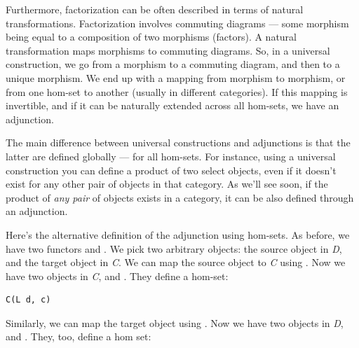 Furthermore, factorization can be often described in terms of natural
transformations. Factorization involves commuting diagrams --- some
morphism being equal to a composition of two morphisms (factors). A
natural transformation maps morphisms to commuting diagrams. So, in a
universal construction, we go from a morphism to a commuting diagram,
and then to a unique morphism. We end up with a mapping from morphism to
morphism, or from one hom-set to another (usually in different
categories). If this mapping is invertible, and if it can be naturally
extended across all hom-sets, we have an adjunction.

The main difference between universal constructions and adjunctions is
that the latter are defined globally --- for all hom-sets. For instance,
using a universal construction you can define a product of two select
objects, even if it doesn't exist for any other pair of objects in that
category. As we'll see soon, if the product of \emph{any pair} of
objects exists in a category, it can be also defined through an
adjunction.

\begin{figure}[H]
\centering
{}
\end{figure}

\noindent
Here's the alternative definition of the adjunction using hom-sets. As
before, we have two functors  and
. We pick two arbitrary objects: the
source object  in \emph{D}, and the target object 
in \emph{C}. We can map the source object  to \emph{C} using
. Now we have two objects in \emph{C},  and
. They define a hom-set:

\begin{Verbatim}[commandchars=\\\{\}]
C(L d, c)
\end{Verbatim}
Similarly, we can map the target object  using . Now
we have two objects in \emph{D},  and . They,
too, define a hom set:

